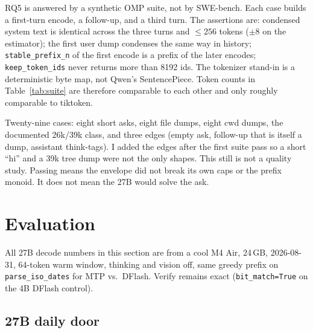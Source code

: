 RQ5 is answered by a synthetic OMP suite, not by SWE-bench. Each case builds a first-turn encode, a follow-up, and a third turn. The assertions are: condensed system text is identical across the three turns and $\le 256$ tokens ($\pm 8$ on the estimator); the first user dump condenses the same way in history; \texttt{stable\_prefix\_n} of the first encode is a prefix of the later encodes; \texttt{keep\_token\_ids} never returns more than 8192 ids. The tokenizer stand-in is a deterministic byte map, not Qwen's SentencePiece. Token counts in Table~\ref{tab:suite} are therefore comparable to each other and only roughly comparable to tiktoken.

Twenty-nine cases: eight short asks, eight file dumps, eight cwd dumps, the documented 26k/39k class, and three edges (empty ask, follow-up that is itself a dump, assistant think-tags). I added the edges after the first suite pass so a short ``hi'' and a 39k tree dump were not the only shapes. This still is not a quality study. Passing means the envelope did not break its own caps or the prefix monoid. It does not mean the 27B would solve the ask.

\section{Evaluation}
\label{sec:eval}

All 27B decode numbers in this section are from a cool M4 Air, 24\,GB, 2026-08-31, 64-token warm window, thinking and vision off, same greedy prefix on \texttt{parse\_iso\_dates} for MTP vs.\ DFlash. Verify remains exact (\texttt{bit\_match=True} on the 4B DFlash control).

\subsection{27B daily door}

